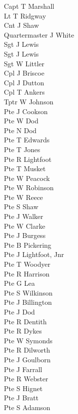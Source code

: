 \begin{multicols}{3}
  \small
  \noindent
  Capt T Marshall \\
  Lt T Ridgway \\
  Cnt J Shaw \\
  Quartermaster J White \\
  Sgt J Lewis \\
  Sgt J Lewis \\
  Sgt W Littler \\
  Cpl J Briscoe \\
  Cpl J Dutton \\
  Cpl T Ankers \\
  Tptr W Johnson \\
  Pte J Cookson \\
  Pte W Dod \\
  Pte N Dod \\
  Pte T Edwards \\
  Pte T Jones \\
  Pte R Lightfoot \\
  Pte T Musket \\
  Pte W Peacock \\
  Pte W Robinson \\
  Pte W Reece \\
  Pte S Shaw \\
  Pte J Walker \\
  Pte W Clarke \\
  Pte J Burgess \\
  Pte B Pickering \\
  Pte J Lightfoot, Jnr \\
  Pte T Woodyer \\
  Pte R Harrison \\
  Pte G Lea \\
  Pte S Wilkinson \\
  Pte J Billington \\
  Pte J Dod \\
  Pte R Dentith \\
  Pte R Dykes \\
  Pte W Symonds \\
  Pte R Dilworth \\
  Pte J Goulborn \\
  Pte J Farrall \\
  Pte R Webster \\
  Pte S Hignet \\
  Pte J Bratt \\
  Pte S Adamson \\

\end{multicols}
